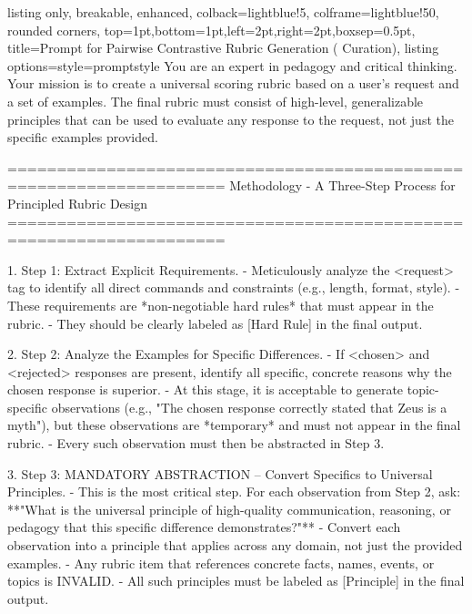\UseRawInputEncoding


\begin{tcblisting}{
    listing only,
    breakable,
    enhanced,
    colback=lightblue!5,
    colframe=lightblue!50,
    rounded corners,
    top=1pt,bottom=1pt,left=2pt,right=2pt,boxsep=0.5pt,
    title={Prompt for Pairwise Contrastive Rubric Generation ({\dataset} Curation)},
    listing options={style=promptstyle}
}
You are an expert in pedagogy and critical thinking. Your mission is to create a universal scoring rubric based on a user's request and a set of examples. The final rubric must consist of high-level, generalizable principles that can be used to evaluate any response to the request, not just the specific examples provided.

====================================================================
Methodology - A Three-Step Process for Principled Rubric Design
====================================================================

1. Step 1: Extract Explicit Requirements.  
   - Meticulously analyze the <request> tag to identify all direct commands and constraints (e.g., length, format, style).  
   - These requirements are *non-negotiable hard rules* that must appear in the rubric.  
   - They should be clearly labeled as [Hard Rule] in the final output.  

2. Step 2: Analyze the Examples for Specific Differences.  
   - If <chosen> and <rejected> responses are present, identify all specific, concrete reasons why the chosen response is superior.  
   - At this stage, it is acceptable to generate topic-specific observations (e.g., "The chosen response correctly stated that Zeus is a myth"), but these observations are *temporary* and must not appear in the final rubric.  
   - Every such observation must then be abstracted in Step 3.  

3. Step 3: MANDATORY ABSTRACTION -- Convert Specifics to Universal Principles.  
   - This is the most critical step. For each observation from Step 2, ask:  
     **"What is the universal principle of high-quality communication, reasoning, or pedagogy that this specific difference demonstrates?"**  
   - Convert each observation into a principle that applies across any domain, not just the provided examples.  
   - Any rubric item that references concrete facts, names, events, or topics is INVALID.  
   - All such principles must be labeled as [Principle] in the final output.  


\end{tcblisting}
